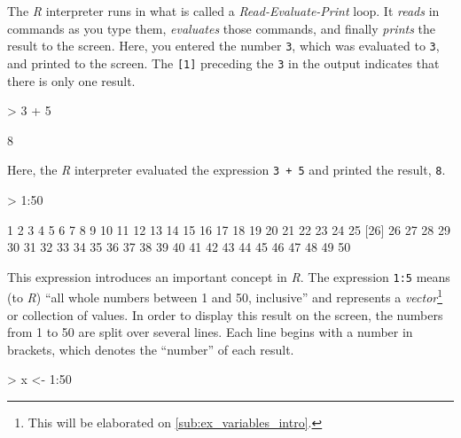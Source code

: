 \documentclass[10pt,letterpaper]{article}
\newenvironment{Schunk}{}{}
\begin{document}
The \emph{R} interpreter runs in what is called a \emph{Read-Evaluate-Print} loop.  It \emph{reads} in commands as you type them, \emph{evaluates} those commands, and finally \emph{prints} the result to the screen.  Here, you entered the number \texttt{3}, which was evaluated to \texttt{3}, and printed to the screen.  The \texttt{[1]} preceding the \texttt{3} in the output indicates that there is only one result.

\begin{Schunk}
\begin{Sinput}
> 3 + 5
\end{Sinput}
\begin{Soutput}
[1] 8
\end{Soutput}
\end{Schunk}

Here, the \emph{R} interpreter evaluated the expression \texttt{3 + 5} and printed the result, \texttt{8}.

\begin{Schunk}
\begin{Sinput}
> 1:50
\end{Sinput}
\begin{Soutput}
 [1]  1  2  3  4  5  6  7  8  9 10 11 12 13 14 15 16 17 18 19 20 21 22 23 24 25
[26] 26 27 28 29 30 31 32 33 34 35 36 37 38 39 40 41 42 43 44 45 46 47 48 49 50
\end{Soutput}
\end{Schunk}

This expression introduces an important concept in \emph{R}.  The expression \texttt{1:5} means (to \emph{R}) ``all whole numbers between 1 and 50, inclusive'' and represents a \emph{vector}\footnote{This will be elaborated on \ref{sub:ex_variables_intro}.} or collection of values.  In order to display this result on the screen, the numbers from 1 to 50 are split over several lines.  Each line begins with a number in brackets, which denotes the ``number'' of each result.

\begin{Schunk}
\begin{Sinput}
> x <- 1:50
\end{Sinput}
\end{Schunk}
\end{document}
